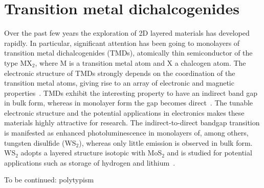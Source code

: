 \section{Transition metal dichalcogenides}
\label{sec:tmd}

Over the past few years the exploration of 2D layered materials
has developed rapidly. 
%
In particular, significant attention has been 
going to monolayers of transition metal dichalcogenides (TMDs),
atomically thin semiconductor of the type MX$_2$, where M is a 
transition metal atom and X a chalcogen atom. 
%
The electronic structure of TMDs strongly depends on the coordination 
of the transition metal atoms, giving rise to an array of electronic
and magnetic properties~\cite{Chhowalla:2013}.
%
TMDs exhibit the interesting property to have an indirect
band gap in bulk form, whereas in monolayer form the gap becomes
direct~\cite{Splendiani:2010}.
%
The tunable electronic structure and the potential applications in
electronics makes these materials highly attractive for research. 
%
The indirect-to-direct bandgap transition is manifested as enhanced
photoluminescence in monolayers of, among others, tungsten disulfide
(WS$_2$), whereas only little emission is observed in bulk form.
%
WS$_2$ adopts a layered structure isotopic with MoS$_2$ and is studied
for potential applications such as storage of hydrogen and lithium~\cite{Bhandavat:2012}.
%

To be continued: polytypism

